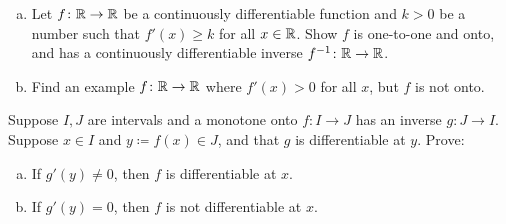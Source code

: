 \begin{exercise}
\leavevmode
\begin{enumerate}[a)]
\item
Let $f \colon {\mathbb{R}} \to {\mathbb{R}}$ be a continuously differentiable function
and $k > 0$ be a number such that $f'(x) \geq k$ for all $x \in {\mathbb{R}}$.
Show $f$ is one-to-one and onto, and has a continuously differentiable
inverse $f^{-1} \colon {\mathbb{R}} \to {\mathbb{R}}$.
\item
Find an example $f \colon {\mathbb{R}} \to {\mathbb{R}}$
where $f'(x) > 0$
for all $x$, but $f$ is not onto.
\end{enumerate}
\end{exercise}

\begin{exercise}
Suppose $I,J$ are intervals and a monotone onto $f \colon I \to J$ has an inverse $g \colon J \to I$.
Suppose $x \in I$ and $y \coloneqq f(x) \in J$, and that $g$ is differentiable at
$y$.  Prove:
\begin{enumerate}[a)]
\item
If $g'(y) \neq 0$, then $f$ is differentiable at $x$.
\item
If $g'(y) = 0$, then $f$ is not differentiable at $x$.
\end{enumerate}
\end{exercise}
